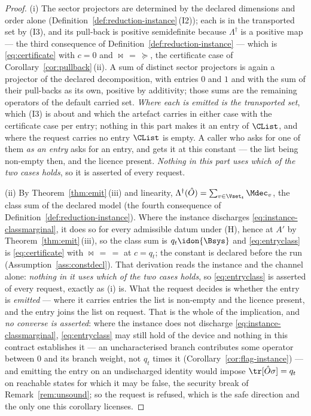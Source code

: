 \begin{proof}
(i) The sector projectors are determined by the declared dimensions and
order alone (Definition~\ref{def:reduction-instance}\,(I2)); each is in the
transported set by (I3), and its pull-back is positive semidefinite because
$\Lambda^{\dagger}$ is a positive map --- the third consequence of
Definition~\ref{def:reduction-instance} --- which is
\eqref{eq:certificate} with $c=0$ and $\bowtie\,=\,\succeq$, the certificate
case of Corollary~\ref{cor:pullback}\,(ii). A sum of distinct sector
projectors is again a projector of the declared decomposition, with entries
$0$ and $1$ and with the sum of their pull-backs as its own, positive by
additivity; those sums are the remaining operators of the default carried
set. \emph{Where each is emitted is the transported set}, which (I3) is
about and which the artefact carries in either case with the certificate
case per entry; nothing in this part makes it an entry of $\CList$, and
where the request carries no entry $\CList$ is empty. A caller who asks for
one of them \emph{as an entry} asks for an entry, and gets it at this
constant --- the list being non-empty then, and the licence present.
\emph{Nothing in this part uses which of the two cases holds}, so it is
asserted of every request.

(ii) By Theorem~\ref{thm:emit}\,(iii) and linearity,
$\Lambda^{\dagger}(\hat O)=\sum_{v\in\Vset_t}\Mdec_v$, the class sum of the
declared model (the fourth consequence of
Definition~\ref{def:reduction-instance}). Where the instance discharges
\eqref{eq:instance-classmarginal}, it does so for every admissible datum
under (H), hence at $A'$ by Theorem~\ref{thm:emit}\,(iii), so the class sum
is $q_t\idon{\Bsys}$ and \eqref{eq:entryclass} is \eqref{eq:certificate}
with $\bowtie\,=\,=$ at $c=q_t$; the constant is declared before the run
(Assumption~\ref{ass:constdecl}). That derivation reads the instance and the
channel alone: \emph{nothing in it uses which of the two cases holds}, so
\eqref{eq:entryclass} is asserted of every request, exactly as (i) is. What
the request decides is whether the entry is \emph{emitted} --- where it
carries entries the list is non-empty and the licence present, and the entry
joins the list on request. That is the whole of the implication, and
\emph{no converse is asserted}: where the instance does not discharge
\eqref{eq:instance-classmarginal}, \eqref{eq:entryclass} may still hold of
the device and nothing in this contract establishes it --- an
uncharacterised branch contributes some operator between $0$ and its branch
weight, not $q_t$ times it (Corollary~\ref{cor:flag-instance}) --- and
emitting the entry on an undischarged identity would impose
$\tr[\hat O\sigma]=q_t$ on reachable states for which it may be false, the
security break of Remark~\ref{rem:unsound}; so the request is refused, which
is the safe direction and the only one this corollary licenses.


\end{proof}
